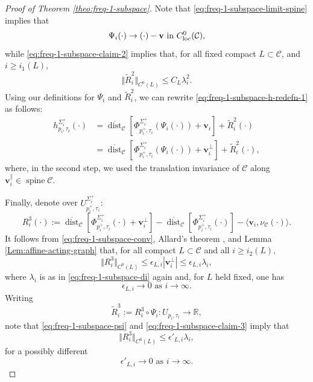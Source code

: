 \documentclass[11pt, letterpaper, reqno]{amsart}
\numberwithin{equation}{section}
\theoremstyle{remark}
\newcommand{\RR}{\mathbb{R}}
\newcommand{\cC}{\mathcal{C}}
\newcommand{\mbfv}{\mathbf{v}}
\newcommand{\dist}{\operatorname{dist}}
\newcommand{\spine}{\operatorname{spine}}
\newcommand{\Sdist}{\overline{\dist}}
\begin{document}
\begin{proof}[Proof of Theorem \ref{theo:freq-1-subspace}]
Note that \eqref{eq:freq-1-subspace-limit-spine} implies that
\begin{equation} \label{eq:freq-1-subspace-psi}
	\Psi_i(\cdot) \to (\cdot) - \mbfv \text{ in } C^0_{\textnormal{loc}}(\cC),
\end{equation}
while \eqref{eq:freq-1-subspace-claim-2} implies that, for all fixed compact $L \subset \cC$, and $i \geq i_1(L)$,
\begin{equation} \label{eq:freq-1-subspace-claim-2-final}
	\Vert \tilde R^2_i \Vert_{C^0(L)} \leq C_L \lambda_i^2.
\end{equation}
Using our definitions for $\Psi_i$ and $\tilde R^2_i$, we can rewrite \eqref{eq:freq-1-subspace-h-redefn-1} as follows:
\begin{align} \label{eq:freq-1-subspace-h-redefn-2}
	h^{\Sigma_i^+}_{p_i,\tau_i}(\cdot) 
		& = \Sdist_{\cC} \left[ \Phi^{\Sigma_i^+}_{p_i^+, \tau_i} (\Psi_i(\cdot)) + \mbfv_i \right] + \tilde R^2_i(\cdot) \nonumber \\
		& = \Sdist_{\cC} \left[ \Phi^{\Sigma_i^+}_{p_i^+, \tau_i} (\Psi_i(\cdot)) + \mbfv_i^\perp \right] + \tilde R^2_i(\cdot),
\end{align}
where, in the second step, we used the translation invariance of $\cC$ along $\mbfv_i^\parallel \in \spine \cC$.

Finally, denote over $U^{\Sigma_i^+}_{p_i^+, \tau_i}$:
\[ R^3_i(\cdot) := \Sdist_{\cC} \left[ \Phi^{\Sigma_i^+}_{p_i^+, \tau_i} (\cdot) + \mbfv_i^\perp \right] - \Sdist_{\cC} \left[ \Phi^{\Sigma_i^+}_{p_i^+, \tau_i}(\cdot) \right] - \langle \mbfv_i, \nu_\cC(\cdot) \rangle. \]
It follows from \eqref{eq:freq-1-subspace-conv}, Allard's theorem \cite{Allard:first-variation}, and Lemma \ref{Lem:affine-acting-graph} that, for all compact $L \subset \cC$ and all $i \geq i_2(L)$, 
\begin{equation} \label{eq:freq-1-subspace-claim-3}
	\Vert R^3_i \Vert_{C^0(L)} \leq \epsilon_{L,i} |\mbfv_i^\perp| \leq \epsilon_{L,i} \lambda_i,
\end{equation}
where $\lambda_i$ is as in \eqref{eq:freq-1-subspace-di} again and, for $L$ held fixed, one has
\begin{equation} \label{eq:freq-1-subspace-claim-3-eps}
	\epsilon_{L,i} \to 0 \text{ as } i \to \infty.
\end{equation}
Writing
\[ \tilde R^3_i := R^3_i \circ \Psi_i : U_{p_i, \tau_i} \to \RR, \]
note that \eqref{eq:freq-1-subspace-psi} and \eqref{eq:freq-1-subspace-claim-3} imply that
\begin{equation} \label{eq:freq-1-subspace-claim-3-final}
	\Vert R^3_i \Vert_{C^0(L)} \leq \epsilon'_{L,i} \lambda_i,
\end{equation}
for a possibly different
\begin{equation} \label{eq:freq-1-subspace-claim-3-final-eps}
	\epsilon'_{L,i} \to 0 \text{ as } i \to \infty.
\end{equation}



\end{proof}
\end{document}
